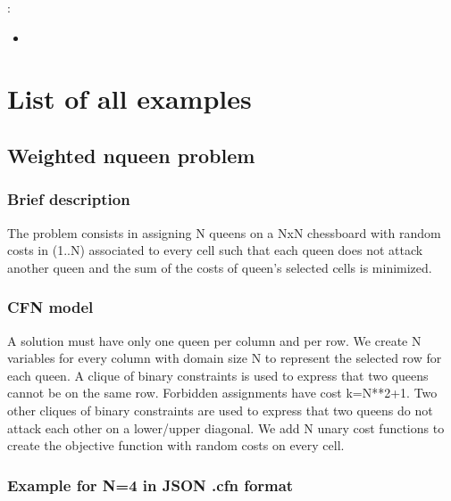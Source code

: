 \documentclass[letterpaper,10pt,openany,oneside,english]{sphinxmanual}
\begin{document}
\sphinxAtStartPar
{} :
\begin{itemize}
\item {} 
\sphinxAtStartPar
{\hyperref[\detokenize{examples/snum:snum}]{}}

\end{itemize}


\chapter{List of all examples}
\label{\detokenize{examples/usecases_pdf:list-of-all-examples}}\label{\detokenize{examples/usecases_pdf:examples-toc}}
\sphinxstepscope


\section{Weighted n\sphinxhyphen{}queen problem}
\label{\detokenize{examples/tuto_wnqp:weighted-n-queen-problem}}\label{\detokenize{examples/tuto_wnqp:tuto-wnqp}}\label{\detokenize{examples/tuto_wnqp::doc}}



\subsection{Brief description}
\label{\detokenize{examples/tuto_wnqp:brief-description}}
\sphinxAtStartPar
The problem consists in assigning N queens on a NxN chessboard with random costs in (1..N) associated to every cell such that each queen does not attack another queen and the sum of the costs of queen’s selected cells is minimized.


\subsection{CFN model}
\label{\detokenize{examples/tuto_wnqp:cfn-model}}
\sphinxAtStartPar
A solution must have only one queen per column and per row. We create N variables for every column with domain size N to represent the selected row for each queen. A clique of binary constraints is used to express that two queens cannot be on the same row. Forbidden assignments have cost k=N**2+1. Two other cliques of binary constraints are used to express that two queens do not attack each other on a lower/upper diagonal. We add N unary cost functions to create the objective function with random costs on every cell.


\subsection{Example for N=4 in JSON .cfn format}
\label{\detokenize{examples/tuto_wnqp:example-for-n-4-in-json-cfn-format}}
\sphinxAtStartPar
{}
\end{document}

